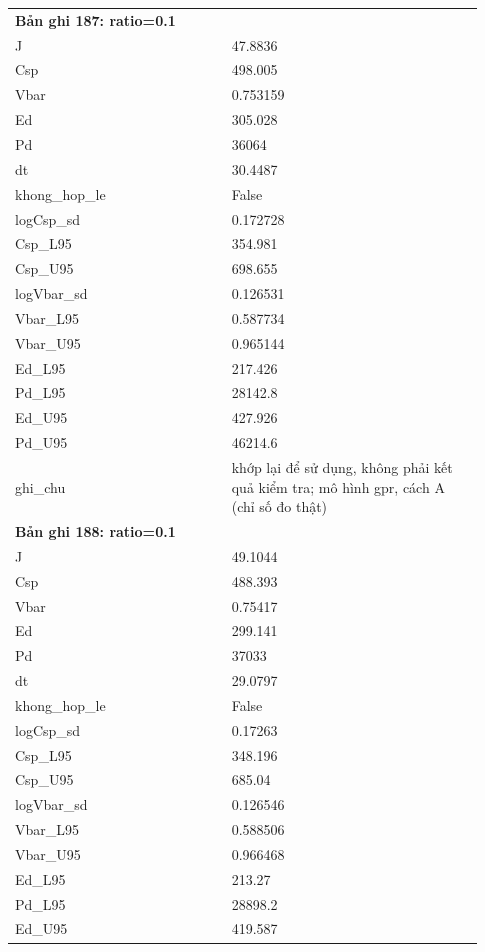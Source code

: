 \begin{longtable}{p{0.43\linewidth}p{0.50\linewidth}}
\multicolumn{2}{p{0.95\linewidth}}{\textbf{Bản ghi 187: ratio=0.1}} \\
J & 47.8836 \\
Csp & 498.005 \\
Vbar & 0.753159 \\
Ed & 305.028 \\
Pd & 36064 \\
dt & 30.4487 \\
khong\_\allowbreak hop\_\allowbreak le & False \\
logCsp\_\allowbreak sd & 0.172728 \\
Csp\_\allowbreak L95 & 354.981 \\
Csp\_\allowbreak U95 & 698.655 \\
logVbar\_\allowbreak sd & 0.126531 \\
Vbar\_\allowbreak L95 & 0.587734 \\
Vbar\_\allowbreak U95 & 0.965144 \\
Ed\_\allowbreak L95 & 217.426 \\
Pd\_\allowbreak L95 & 28142.8 \\
Ed\_\allowbreak U95 & 427.926 \\
Pd\_\allowbreak U95 & 46214.6 \\
ghi\_\allowbreak chu & khớp lại để sử dụng, không phải kết quả kiểm tra; mô hình gpr, cách A (chỉ số đo thật) \\
\midrule
\multicolumn{2}{p{0.95\linewidth}}{\textbf{Bản ghi 188: ratio=0.1}} \\
J & 49.1044 \\
Csp & 488.393 \\
Vbar & 0.75417 \\
Ed & 299.141 \\
Pd & 37033 \\
dt & 29.0797 \\
khong\_\allowbreak hop\_\allowbreak le & False \\
logCsp\_\allowbreak sd & 0.17263 \\
Csp\_\allowbreak L95 & 348.196 \\
Csp\_\allowbreak U95 & 685.04 \\
logVbar\_\allowbreak sd & 0.126546 \\
Vbar\_\allowbreak L95 & 0.588506 \\
Vbar\_\allowbreak U95 & 0.966468 \\
Ed\_\allowbreak L95 & 213.27 \\
Pd\_\allowbreak L95 & 28898.2 \\
Ed\_\allowbreak U95 & 419.587 \\

\end{longtable}
